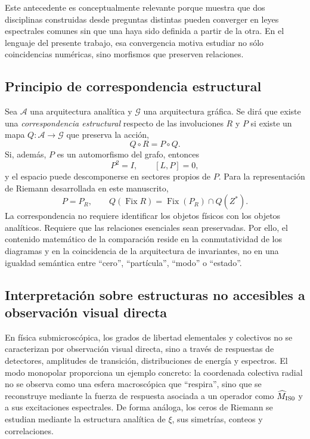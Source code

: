\documentclass[11pt]{amsart}
\theoremstyle{definition}
\theoremstyle{remark}
\begin{document}
Este antecedente es conceptualmente relevante porque muestra que dos disciplinas construidas desde preguntas distintas pueden converger en leyes espectrales comunes sin que una haya sido definida a partir de la otra. En el lenguaje del presente trabajo, esa convergencia motiva estudiar no sólo coincidencias numéricas, sino morfismos que preserven relaciones.

\subsection{Principio de correspondencia estructural}
Sea $\mathcal A$ una arquitectura analítica y $\mathcal G$ una arquitectura gráfica. Se dirá que existe una \emph{correspondencia estructural} respecto de las involuciones $R$ y $P$ si existe un mapa $Q:\mathcal A\to\mathcal G$ que preserva la acción,
\begin{equation}\label{eq:structcorr}
 \boxed{Q\circ R=P\circ Q.}
\end{equation}
Si, además, $P$ es un automorfismo del grafo, entonces
\begin{equation}\label{eq:structcorrLap}
 P^2=I,\qquad [L,P]=0,
\end{equation}
y el espacio puede descomponerse en sectores propios de $P$. Para la representación de Riemann desarrollada en este manuscrito,
\begin{equation}
 P=P_R,\qquad Q(\operatorname{Fix}R)=\operatorname{Fix}(P_R)\cap Q(Z^*).
\end{equation}
La correspondencia no requiere identificar los objetos físicos con los objetos analíticos. Requiere que las relaciones esenciales sean preservadas. Por ello, el contenido matemático de la comparación reside en la conmutatividad de los diagramas y en la coincidencia de la arquitectura de invariantes, no en una igualdad semántica entre ``cero'', ``partícula'', ``modo'' o ``estado''.

\subsection{Interpretación sobre estructuras no accesibles a observación visual directa}
En física submicroscópica, los grados de libertad elementales y colectivos no se caracterizan por observación visual directa, sino a través de respuestas de detectores, amplitudes de transición, distribuciones de energía y espectros. El modo monopolar proporciona un ejemplo concreto: la coordenada colectiva radial no se observa como una esfera macroscópica que ``respira'', sino que se reconstruye mediante la fuerza de respuesta asociada a un operador como $\widehat M_{\rm IS0}$ y a sus excitaciones espectrales. De forma análoga, los ceros de Riemann se estudian mediante la estructura analítica de $\xi$, sus simetrías, conteos y correlaciones.
\end{document}

